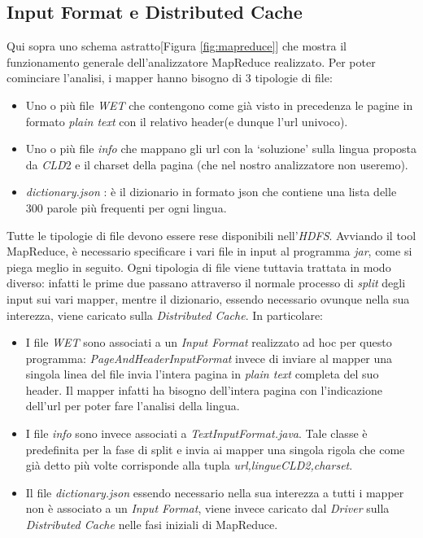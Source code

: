 \documentclass{article}
\newcommand{\MR}{MapReduce}
\newcommand{\cld}{\textit{CLD}2}
\newcommand{\DC}{\textit{Distributed Cache}}
\newcommand{\pt}{\textit{plain text}}
\newcommand{\filename}[1]{\textit{#1}}
\newcommand{\class}[1]{\textit{#1}}
\newcommand{\imgref}[1]{[Figura \ref{#1}]}
\begin{document}
\subsection{Input Format e Distributed Cache}
Qui sopra uno schema astratto\imgref{fig:mapreduce} che mostra il funzionamento generale dell'analizzatore \MR{} realizzato. Per poter cominciare l'analisi, i mapper hanno bisogno di 3 tipologie di file: 
\begin{itemize}
    \item Uno o più file \textit{WET} che contengono come già visto in precedenza le pagine in formato \pt{} con il relativo header(e dunque l'url univoco).
    \item Uno o più file \textit{info} che mappano gli url con la `soluzione' sulla lingua proposta da \cld{} e il charset della pagina (che nel nostro analizzatore non useremo).
    \item \filename{dictionary.json} : è il dizionario in formato json che contiene una lista delle 300 parole più frequenti per ogni lingua.
\end{itemize}
Tutte le tipologie di file devono essere rese disponibili nell'\textit{HDFS}. Avviando il tool \MR{}, è necessario specificare i vari file in input al programma \textit{jar}, come si piega meglio in seguito. Ogni tipologia di file viene tuttavia trattata in modo diverso: infatti le prime due passano attraverso il normale processo di \textit{split} degli input sui vari mapper, mentre il dizionario, essendo necessario ovunque nella sua interezza, viene caricato sulla \DC{}. In particolare:
\begin{itemize}
    \item I file \textit{WET} sono associati a un \textit{Input Format} realizzato ad hoc per questo programma: \class{PageAndHeaderInputFormat} invece di inviare al mapper una singola linea del file invia l'intera pagina in \pt{} completa del suo header. Il mapper infatti ha bisogno dell'intera pagina con l'indicazione dell'url per poter fare l'analisi della lingua.
    \item I file \textit{info} sono invece associati a \filename{TextInputFormat.java}. Tale classe è predefinita per la fase di split e invia ai mapper una singola rigola che come già detto più volte corrisponde alla tupla \textit{\textlangle url,lingue\cld{},charset\textrangle}.
    \item Il file \filename{dictionary.json} essendo necessario nella sua interezza a tutti i mapper non è associato a un \textit{Input Format}, viene invece caricato dal \filename{Driver} sulla \DC{} nelle fasi iniziali di \MR{}.
\end{itemize}
\end{document}
